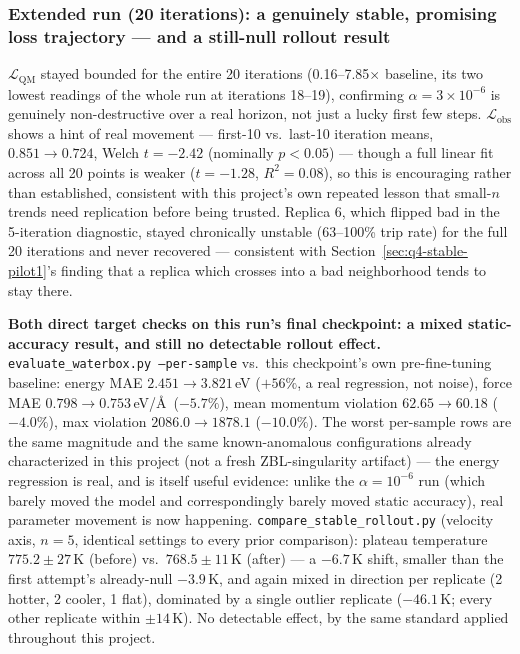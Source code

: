 \documentclass[11pt]{article}
\begin{document}
\subsubsection{Extended run (20 iterations): a genuinely stable, promising loss trajectory --- and a still-null rollout result}
\label{sec:q4-stable-lr-final}

$\mathcal{L}_{\text{QM}}$ stayed bounded for the entire 20 iterations
(0.16--7.85$\times$ baseline, its two lowest readings of the whole run at
iterations 18--19), confirming $\alpha=3\times10^{-6}$ is genuinely
non-destructive over a real horizon, not just a lucky first few steps.
$\mathcal{L}_{\text{obs}}$ shows a hint of real movement --- first-10 vs.\
last-10 iteration means, $0.851\to0.724$, Welch $t=-2.42$ (nominally
$p<0.05$) --- though a full linear fit across all 20 points is weaker
($t=-1.28$, $R^2=0.08$), so this is encouraging rather than established,
consistent with this project's own repeated lesson that small-$n$ trends
need replication before being trusted. Replica 6, which flipped bad in the
5-iteration diagnostic, stayed chronically unstable (63--100\% trip rate)
for the full 20 iterations and never recovered --- consistent with
Section~\ref{sec:q4-stable-pilot1}'s finding that a replica which crosses
into a bad neighborhood tends to stay there.

\textbf{Both direct target checks on this run's final checkpoint: a mixed
static-accuracy result, and still no detectable rollout effect.}
\texttt{evaluate\_waterbox.py --per-sample} vs.\ this checkpoint's own
pre-fine-tuning baseline: energy MAE $2.451\to3.821$\,eV ($+56\%$, a real
regression, not noise), force MAE $0.798\to0.753$\,eV/\AA\ ($-5.7\%$), mean
momentum violation $62.65\to60.18$ ($-4.0\%$), max violation
$2086.0\to1878.1$ ($-10.0\%$). The worst per-sample rows are the same
magnitude and the same known-anomalous configurations already
characterized in this project (not a fresh ZBL-singularity artifact) ---
the energy regression is real, and is itself useful evidence: unlike the
$\alpha=10^{-6}$ run (which barely moved the model and correspondingly
barely moved static accuracy), real parameter movement is now happening.
\texttt{compare\_stable\_rollout.py} (velocity axis, $n=5$, identical
settings to every prior comparison): plateau temperature $775.2\pm27$\,K
(before) vs.\ $768.5\pm11$\,K (after) --- a $-6.7$\,K shift, smaller than
the first attempt's already-null $-3.9$\,K, and again mixed in direction
per replicate (2 hotter, 2 cooler, 1 flat), dominated by a single outlier
replicate ($-46.1$\,K; every other replicate within $\pm14$\,K). No
detectable effect, by the same standard applied throughout this project.
\end{document}
